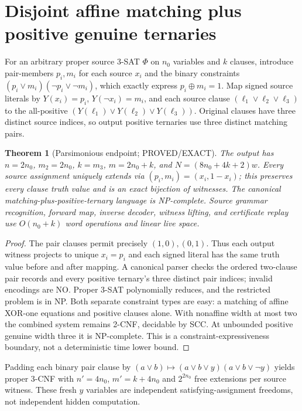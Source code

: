 \documentclass[11pt]{article}
\newtheorem{theorem}{Theorem}\newtheorem{lemma}{Lemma}
\begin{document}
\section{Disjoint affine matching plus positive genuine ternaries}
For an arbitrary proper source 3-SAT $\Phi$ on $n_0$ variables and $k$ clauses, introduce pair-members $p_i,m_i$ for each source $x_i$ and the binary constraints $(p_i\vee m_i)(\neg p_i\vee\neg m_i)$, which exactly express $p_i\oplus m_i=1$. Map signed source literals by $Y(x_i)=p_i$, $Y(\neg x_i)=m_i$, and each source clause $(\ell_1\vee\ell_2\vee\ell_3)$ to the all-positive $(Y(\ell_1)\vee Y(\ell_2)\vee Y(\ell_3))$. Original clauses have three distinct source indices, so output positive ternaries use three distinct matching pairs.
\begin{theorem}[Parsimonious endpoint; PROVED/EXACT]
The output has $n=2n_0$, $m_2=2n_0$, $k=m_3$, $m=2n_0+k$, and $N=(8n_0+4k+2)w$. Every source assignment uniquely extends via $(p_i,m_i)=(x_i,1-x_i)$; this preserves every clause truth value and is an exact bijection of witnesses. The canonical matching-plus-positive-ternary language is NP-complete. Source grammar recognition, forward map, inverse decoder, witness lifting, and certificate replay use $O(n_0+k)$ word operations and linear live space.
\end{theorem}
\begin{proof}
The pair clauses permit precisely $(1,0),(0,1)$. Thus each output witness projects to unique $x_i=p_i$ and each signed literal has the same truth value before and after mapping. A canonical parser checks the ordered two-clause pair records and every positive ternary's three distinct pair indices; invalid encodings are NO. Proper 3-SAT polynomially reduces, and the restricted problem is in NP. Both separate constraint types are easy: a matching of affine XOR-one equations and positive clauses alone. With nonaffine width at most two the combined system remains 2-CNF, decidable by SCC. At unbounded positive genuine width three it is NP-complete. This is a constraint-expressiveness boundary, not a deterministic time lower bound.
\end{proof}
Padding each binary pair clause by $(a\vee b)\mapsto(a\vee b\vee y)(a\vee b\vee\neg y)$ yields proper 3-CNF with $n'=4n_0$, $m'=k+4n_0$ and $2^{2n_0}$ free extensions per source witness. These fresh $y$ variables are independent satisfying-assignment freedoms, not independent hidden computation.
\end{document}
